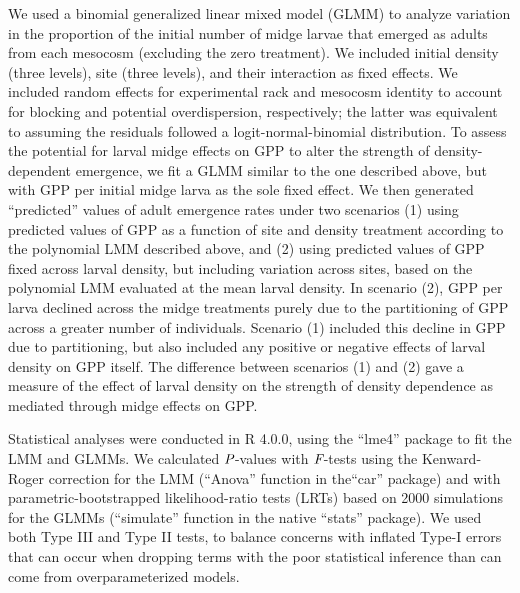 We used a binomial generalized linear mixed model (GLMM) to analyze variation 
in the proportion of the initial number of midge larvae that emerged as adults from each mesocosm 
(excluding the zero treatment). 
We included initial density (three levels), site (three levels), and their interaction
as fixed effects. 
We included random effects for experimental rack and mesocosm identity to account
for blocking and potential overdispersion, respectively;
the latter was equivalent to assuming the residuals followed a logit-normal-binomial distribution.
To assess the potential for larval midge effects on GPP to alter the strength of density-dependent
emergence, 
we fit a GLMM similar to the one described above, 
but with GPP per initial midge larva as the sole fixed effect. 
We then generated ``predicted'' values of adult emergence rates under two scenarios 
(1) using predicted values of GPP as a function of site and density treatment according
to the polynomial LMM described above, 
and (2) using predicted values of GPP fixed across larval density, but including variation 
across sites, based on the polynomial LMM evaluated at the mean larval density.
In scenario (2), GPP per larva declined across the midge treatments purely due to 
the partitioning of GPP across a greater number of individuals.
Scenario (1) included this decline in GPP due to partitioning, but also included
any positive or negative effects of larval density on GPP itself.
The difference between scenarios (1) and (2) gave a measure of the effect of larval
density on the strength of density dependence as mediated through midge effects on GPP.

Statistical analyses were conducted in R 4.0.0,
using the ``lme4'' package to fit the LMM and GLMMs.
We calculated $\emph{P}$-values with $\emph{F}$-tests using
the Kenward-Roger correction for the LMM (``Anova'' function in the``car'' package)
and with parametric-bootstrapped likelihood-ratio tests (LRTs) based on 2000 simulations
for the GLMMs (``simulate'' function in the native ``stats'' package).
We used both Type III and Type II tests,
to balance concerns with inflated Type-I errors that can occur when dropping 
terms with the poor statistical inference than can come from overparameterized models.









